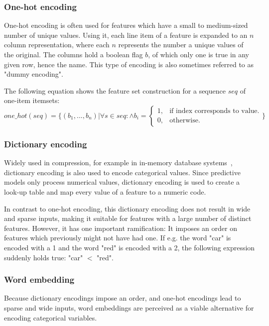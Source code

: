 \subsubsection*{One-hot encoding}
One-hot encoding is often used for features which have a small to medium-sized number of unique values. Using it, each line item of a feature is expanded to an $n$ column representation, where each $n$ represents the number a unique values of the original. The columns hold a boolean flag $b$, of which only one is true in any given row, hence the name. This type of encoding is also sometimes referred to as "dummy encoding".

The following equation shows the feature set construction for a sequence $seq$ of one-item itemsets:
\begin{equation}\label{eq:one-hot}
    one\_hot(seq) = \{(b_1, ..., b_n) | \forall s \in seq: \wedge b_i = 
    \begin{cases}
    1, & \text{if index corresponds to value}.\\
    0, & \text{otherwise}.
    \end{cases}
    \}
\end{equation}

\subsubsection*{Dictionary encoding}
Widely used in compression, for example in in-memory database systems~\cite{plattner2012memory}, dictionary encoding is also used to encode categorical values. Since predictive models only process numerical values, dictionary encoding is used to create a look-up table and map every value of a feature to a numeric code.

In contrast to one-hot encoding, this dictionary encoding does not result in wide and sparse inputs, making it suitable for features with a large number of distinct features. However, it has one important ramification: It imposes an order on features which previously might not have had one. If e.g. the word "car" is encoded with a 1 and the word "red" is encoded with a 2, the following expression suddenly holds true: "car" $<$ "red".

\subsubsection*{Word embedding}
Because dictionary encodings impose an order, and one-hot encodings lead to sparse and wide inputs, word embeddings are perceived as a viable alternative for encoding categorical variables.

